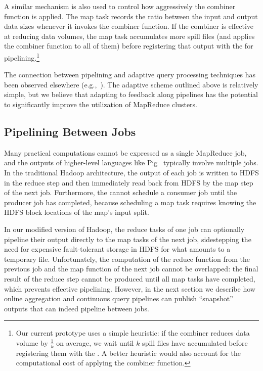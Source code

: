 A similar mechanism is also used to control how aggressively the combiner
function is applied.  The map task records the ratio between the input and
output data sizes whenever it invokes the combiner function.  If the combiner
is effective at reducing data volumes, the map task accumulates more spill
files (and applies the combiner function to all of them) before registering
that output with the {\TT} for pipelining.\footnote{Our current prototype uses
a simple heuristic: if the combiner reduces data volume by $\frac{1}{k}$ on
average, we wait until $k$ spill files have accumulated before registering them
with the {\TT}.  A better heuristic would also account for the computational
cost of applying the combiner function.}

The connection between pipelining and adaptive query processing techniques has
been observed elsewhere (e.g.,~\cite{eddies, bamboo}).  The adaptive scheme
outlined above is relatively simple, but we believe that adapting to feedback
along pipelines has the potential to significantly improve the utilization of
MapReduce clusters.

\subsection{Pipelining Between Jobs}
\label{ch:hop:sec:inter-pipe}

Many practical computations cannot be expressed as a single MapReduce job, and
the outputs of higher-level languages like Pig~\cite{pig-sigmod} typically involve
multiple jobs.  In the traditional Hadoop architecture, the output of each job
is written to HDFS in the reduce step and then immediately read back from HDFS
by the map step of the next job. Furthermore, the {\JT} cannot schedule a
consumer job until the producer job has completed, because scheduling a map task
requires knowing the HDFS block locations of the map's input split.

In our modified version of Hadoop, the reduce tasks of one job can optionally
pipeline their output directly to the map tasks of the next job, sidestepping
the need for expensive fault-tolerant storage in HDFS for what amounts to a
temporary file. Unfortunately, the computation of the reduce function from the
previous job and the map function of the next job cannot be overlapped: the
final result of the reduce step cannot be produced until all map tasks have
completed, which prevents effective pipelining. However, in the next section we
describe how online aggregation and continuous query pipelines can publish
``snapshot'' outputs that can indeed pipeline between jobs.


